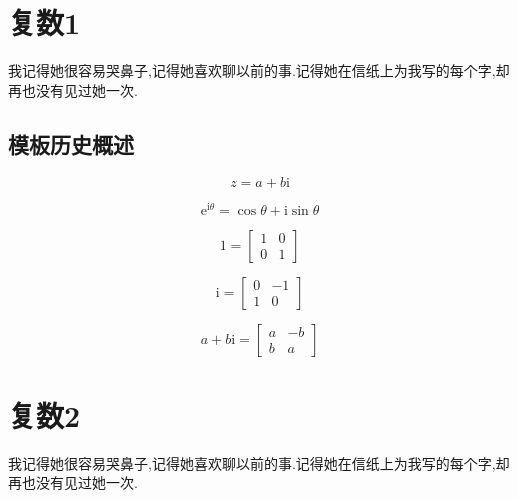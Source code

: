 \chapter{复数1}

\begin{center}
    \textcolor[RGB]{255, 0, 0}{\faHeart}我记得她很容易哭鼻子,记得她喜欢聊以前的事.记得她在信纸上为我写的每个字,却再也没有见过她一次.\textcolor[RGB]{255, 0, 0}{\faHeart}
\end{center}
\vspace{-5pt}
\begin{center}
\end{center}

\section{模板历史概述}

$$
    z = a + b \mathrm{i}
$$

$$
    \mathrm{e}^{\mathrm{i}\theta} = \cos \theta + \mathrm{i} \sin \theta
$$

$$
    1 = \begin{bmatrix}
        1 & 0 \\
        0 & 1
    \end{bmatrix}
$$

$$
    \mathrm{i} =
    \begin{bmatrix}
        0 & -1 \\
        1 & 0
    \end{bmatrix}
$$

$$
    a + b \mathrm{i} =
    \begin{bmatrix}
        a & -b \\
        b & a
    \end{bmatrix}
$$

\newpage

\chapter{复数2}

\begin{center}
    \textcolor[RGB]{255, 0, 0}{\faHeart}我记得她很容易哭鼻子,记得她喜欢聊以前的事.记得她在信纸上为我写的每个字,却再也没有见过她一次.\textcolor[RGB]{255, 0, 0}{\faHeart}
\end{center}
\vspace{-5pt}
\begin{center}
\end{center}


